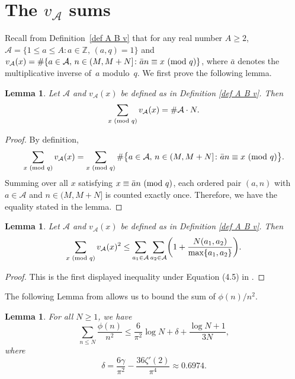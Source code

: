 \documentclass[12pt]{amsart}
\theoremstyle{plain}
\newtheorem{lemma}[theorem]{Lemma}
\theoremstyle{definition}
\newcommand{\cA}{{\mathcal{A}}}
\renewcommand{\pmod}[1]{{\ifmmode\text{\rm\ (mod~$#1$)}\else\discretionary{}{}{\hbox{ }}\rm(mod~$#1$)\fi}}
\begin{document}
\section{The $v_{\cA}$ sums}\label{sec: technical}

Recall from Definition~\ref{def A B v} that for any real number $A\ge 2$, $\cA=\{1\le a \le A\colon a\in\mathbb{Z},\, (a, q)=1\}$ and $v_\cA(x)=\#\{a\in\cA,\, n\in(M,M+N] \colon \bar{a}n\equiv x \pmod{q}\}$, where $\bar{a}$ denotes the multiplicative inverse of~$a$ modulo~$q$. We first prove the following lemma.

\begin{lemma} \label{v_A sum}
Let $\cA$ and $v_\cA(x)$ be defined as in Definition \ref{def A B v}. Then 
$$\displaystyle \sum_{x\pmod q} v_\cA(x) = \#\cA\cdot N.$$
\end{lemma}

\begin{proof}
By definition,
\[
\sum_{x\pmod q} v_\cA(x) = \sum_{x\pmod q} \#\bigl\{ a\in\cA,\, n\in(M,M+N] \colon \bar{a}n\equiv x \pmod{q} \bigr\}.
\]
Summing over all $x$ satisfying $x\equiv\bar an\pmod q$, each ordered pair $(a,n)$ with $a\in\cA$ and $n\in(M,M+N]$ is counted exactly once. Therefore, we have the equality stated in the lemma.
\end{proof}

\begin{lemma} \label{JKL page 8}
Let $\cA$ and $v_\cA(x)$ be defined as in Definition \ref{def A B v}. Then
$$\displaystyle \sum_{x\pmod q} v_\cA(x)^2 \le \sum_{a_1\in\cA}
\sum_{a_2\in\cA} \biggl( 1 + \frac{N(a_1,a_2)}{\max\{a_1,a_2\}} \biggr).$$
\end{lemma}

\begin{proof}
This is the first displayed inequality under Equation (4.5)
in \cite{JKL}.
\end{proof}

The following Lemma from \cite[Lemma 16]{BrokerSutherland2010} allows us to bound the sum of $\phi(n)/n^2$.\begin{lemma}\label{phi sum lemma}
For all $N \geq 1$, we have
\[
\sum_{n\leq N} \frac{\phi(n)}{n^2}
\leq
\frac{6}{\pi^2}\log N
+\delta
+\frac{\log N+1}{3N},
\]
where
\[
\delta
=
\frac{6\gamma}{\pi^2}
-\frac{36\zeta'(2)}{\pi^4}
\approx 0.6974.
\]
\end{lemma}
\end{document}
